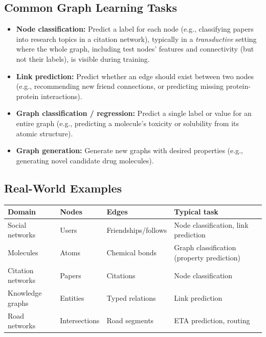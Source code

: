 \documentclass[12pt,a4paper]{article}
\begin{document}
\subsection{Common Graph Learning Tasks}

\begin{itemize}[leftmargin=1.5em]
    \item \textbf{Node classification:} Predict a label for each node (e.g., classifying papers into research topics in a citation network), typically in a \emph{transductive} setting where the whole graph, including test nodes' features and connectivity (but not their labels), is visible during training.
    \item \textbf{Link prediction:} Predict whether an edge should exist between two nodes (e.g., recommending new friend connections, or predicting missing protein-protein interactions).
    \item \textbf{Graph classification / regression:} Predict a single label or value for an entire graph (e.g., predicting a molecule's toxicity or solubility from its atomic structure).
    \item \textbf{Graph generation:} Generate new graphs with desired properties (e.g., generating novel candidate drug molecules).
\end{itemize}

\subsection{Real-World Examples}

\begin{center}
\renewcommand{\arraystretch}{1.3}
\begin{tabular}{|l|p{3.2cm}|p{3.2cm}|p{3.5cm}|}
\hline
\textbf{Domain} & \textbf{Nodes} & \textbf{Edges} & \textbf{Typical task} \\
\hline
Social networks & Users & Friendships/follows & Node classification, link prediction \\
Molecules & Atoms & Chemical bonds & Graph classification (property prediction) \\
Citation networks & Papers & Citations & Node classification \\
Knowledge graphs & Entities & Typed relations & Link prediction \\
Road networks & Intersections & Road segments & ETA prediction, routing \\
\hline
\end{tabular}
\end{center}
\end{document}
